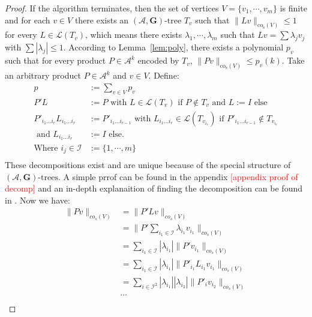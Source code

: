 \begin{proof}
If the algorithm terminates, then the set of vertices $V = \{ v_1, \cdots, v_m \}$ is finite and for each $v \in V$ there exists an $(\mathcal{A},\mathbf{G})\text{-tree } T_v$ such that $\lVert Lv \rVert _{\text{co}_{\text{s}}(V)} \leq 1$ for every $L \in \mathcal{L}(T_v)$, which means there exists $\lambda_1, \cdots, \lambda_m$ such that $Lv = \sum \lambda_j v_j$ with $ \sum |\lambda_j| \leq 1 $. According to Lemma~\ref{lem:poly}, there exists a polynomial $p_v$ such that for every product $P \in \mathcal{A}^k$ encoded by $T_v$, $\lVert Pv \rVert _{\text{co}_{\text{s}}(V)} \leq p_v(k)$.
Take an arbitrary product $P \in \mathcal{A}^k$ and $v \in V$.
Define: 
$$
\begin{aligned}
  p & := \sum \limits_{v \in V} p_v \\
  P' L & := P \text{ with } L  \in  \mathcal{L}(T_v) \text{ if } P \notin T_v \text{ and } L  := I \text{ else}\\
  P'_{i_1 \dots i_r} L_{i_1 \dots i_r} & := P'_{i_1 \dots i_{r-1}} \text{ with } L_{i_1 \dots i_r} \in  \mathcal{L}(T_{v_{i_{r}}}) \text{ if } P'_{i_1 \dots i_{r-1}} \notin T_{v_{i_{r}}}\\
  \text{ and } L_{i_1 \dots i_r} & := I \text{ else.} \\
  \text{Where } i_j \in \mathcal{I} & := \{1, \cdots, m \}\\
\end{aligned}
$$
These decompositions exist and are unique because of the special structure of $(\mathcal{A},\mathbf{G})\text{-trees}$.
A simple prrof can be found in the appendix \textcolor{red}{[appendix proof of decomp]} and an in-depth explanaition of finding the decomposition can be found in \citep{mollerTreebasedApproachJoint2014}.
\newline
Now we have:
$$
\begin{aligned}
  \|Pv\|_{co_s(V)} & = \|P'Lv\|_{co_s(V)} \\ 
  & = \|P' \sum \limits_{i_1 \in \mathcal{I}} \lambda_{i_1} v_{i_1} \|_{co_s(V)} \\ 
  & = \sum \limits_{i_1 \in \mathcal{I}} |\lambda_{i_1}| \|P'v_{i_1} \|_{co_s(V)}\\
  & = \sum \limits_{i_1 \in \mathcal{I}} |\lambda_{i_1}| \|P'_{i_1}L_{i_1}v_{i_1} \|_{co_s(V)} \\ 
  & = \sum \limits_{i \in \mathcal{I}^2} |\lambda_{i_1}| |\lambda_{i_2}| \|P'_{i}v_{i_2} \|_{co_s(V)}\\
  & \cdots \\

\end{aligned}$$
\end{proof}
